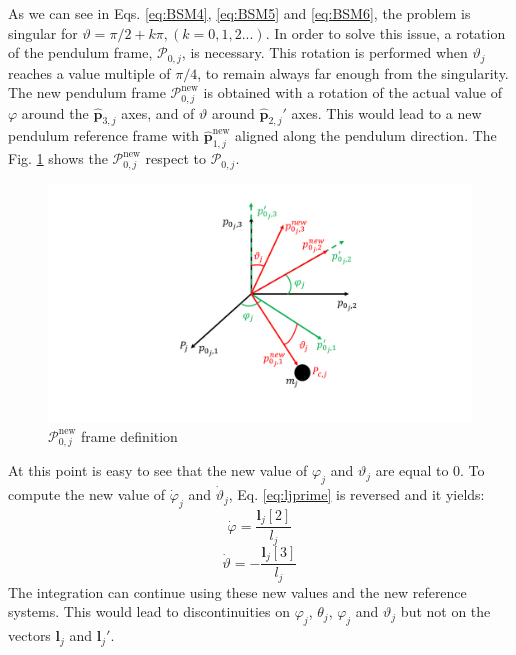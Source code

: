 \documentclass[]{BasiliskReportMemo}
\begin{document}
As we can see in Eqs. \eqref{eq:BSM4}, \eqref{eq:BSM5} and \eqref{eq:BSM6}, the problem is singular for $\vartheta=\pi/2+k\pi, (k=0,1,2...)$. In order to solve this issue, a rotation of the pendulum frame, $\mathcal{P}_{0,j}$, is necessary. This rotation is performed when $\vartheta_j$ reaches a value multiple of $\pi/4$, to remain always far enough from the singularity. The new pendulum frame $\mathcal{P}_{0,j}^{\text{new}}$ is obtained with a rotation of the actual value of $\varphi$ around the $\bm{\hat{p}}_{3,j}$ axes, and of $\vartheta$ around $\bm{\hat{p}}_{2,j}'$ axes. This would lead to a new pendulum reference frame with $\bm{\hat{p}}_{1,j}^{\text{new}}$ aligned along the pendulum direction. The Fig. \ref{fig:newreferencesystem} shows the $\mathcal{P}_{0,j}^{\text{new}}$ respect to $\mathcal{P}_{0,j}$.
\begin{figure}[ht]
		\centering
		\includegraphics[width=13cm]{Figures/referencesystemsP0.pdf}
		\caption{$\mathcal{P}_{0,j}^{\text{new}}$ frame definition}
		\label{fig:newreferencesystem}
	\end{figure} 
At this point is easy to see that the new value of $\varphi_j$ and $\vartheta_j$ are equal to 0. To compute the new value of $\dot{\varphi}_j$ and $\dot{\vartheta}_j$, Eq. \eqref{eq:ljprime} is reversed and it yields:
\begin{equation}
\dot{\varphi}=\frac{\bm{l}_j[2]}{l_j}
\label{eq:RSC1}
\end{equation}
\begin{equation}
\dot{\vartheta}=-\frac{\bm{l}_j[3]}{l_j}
\label{eq:RSC2}
\end{equation}
The integration can continue using these new values and the new reference systems. This would lead to discontinuities on $\varphi_j$, $\theta_j$, $\varphi_j$ and $\vartheta_j$ but not on the vectors $\bm{l}_j$ and $\bm{l}_{j}'$.
\end{document}
